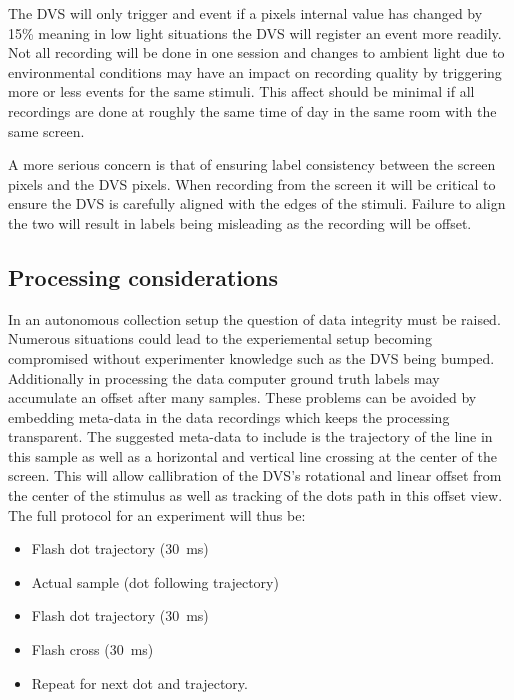 The DVS will only trigger and event if a pixels internal value has changed by 15\% meaning in low light situations the DVS will register an event more readily. 
Not all recording will be done in one session and changes to ambient light due to environmental conditions may have an impact on recording quality by triggering more or less events for the same stimuli.
This affect should be minimal if all recordings are done at roughly the same time of day in the same room with the same screen. 

A more serious concern is that of ensuring label consistency between the screen pixels and the DVS pixels. 
When recording from the screen it will be critical to ensure the DVS is carefully aligned with the edges of the stimuli.
Failure to align the two will result in labels being misleading as the recording will be offset.

\subsection{Processing considerations}
In an autonomous collection setup the question of data integrity must be raised.
Numerous situations could lead to the experiemental setup becoming compromised without experimenter knowledge such as the DVS being bumped.
Additionally in processing the data computer ground truth labels may accumulate an offset after many samples.
These problems can be avoided by embedding meta-data in the data recordings which keeps the processing transparent. 
The suggested meta-data to include is the trajectory of the line in this sample as well as a horizontal and vertical line crossing at the center of the screen.
This will allow callibration of the DVS's rotational and linear offset from the center of the stimulus as well as tracking of the dots path in this offset view. 
The full protocol for an experiment will thus be:

\begin{itemize}
    \itemsep-0.5em
    \item Flash dot trajectory (\SI{30}{\milli\second})
    \item Actual sample (dot following trajectory)
    \item Flash dot trajectory (\SI{30}{\milli\second})
    \item Flash cross (\SI{30}{\milli\second})
    \item Repeat for next dot and trajectory.
\end{itemize}

